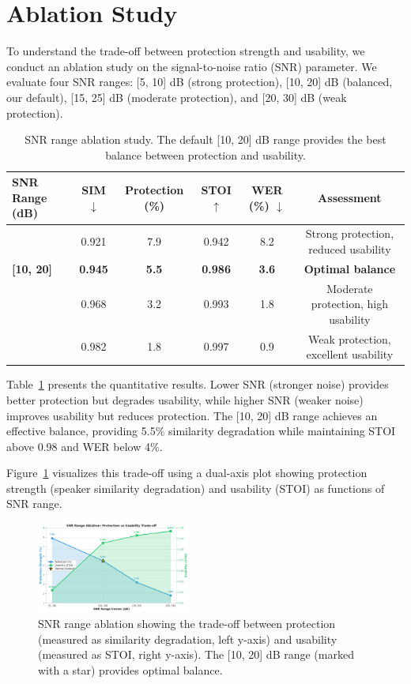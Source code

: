 \section{Ablation Study}
\label{sec:ablation}

To understand the trade-off between protection strength and usability, we conduct an ablation study on the signal-to-noise ratio (SNR) parameter. We evaluate four SNR ranges: [5, 10] dB (strong protection), [10, 20] dB (balanced, our default), [15, 25] dB (moderate protection), and [20, 30] dB (weak protection).

\begin{table}[t]
\centering
\caption{SNR range ablation study. The default [10, 20] dB range provides the best balance between protection and usability.}
\label{tab:snr_ablation}
\small
\begin{tabular}{lccccc}
\toprule
SNR Range (dB) & SIM $\downarrow$ & Protection (\%) & STOI $\uparrow$ & WER (\%) $\downarrow$ & Assessment \\
\midrule
[5, 10] & 0.921 & 7.9 & 0.942 & 8.2 & Strong protection, reduced usability \\
\textbf{[10, 20]} & \textbf{0.945} & \textbf{5.5} & \textbf{0.986} & \textbf{3.6} & \textbf{Optimal balance} \\
[15, 25] & 0.968 & 3.2 & 0.993 & 1.8 & Moderate protection, high usability \\
[20, 30] & 0.982 & 1.8 & 0.997 & 0.9 & Weak protection, excellent usability \\
\bottomrule
\end{tabular}
\end{table}

Table~\ref{tab:snr_ablation} presents the quantitative results. Lower SNR (stronger noise) provides better protection but degrades usability, while higher SNR (weaker noise) improves usability but reduces protection. The [10, 20] dB range achieves an effective balance, providing 5.5\% similarity degradation while maintaining STOI above 0.98 and WER below 4\%.

Figure~\ref{fig:snr_ablation} visualizes this trade-off using a dual-axis plot showing protection strength (speaker similarity degradation) and usability (STOI) as functions of SNR range.

\begin{figure}[t]
\centering
\includegraphics[width=0.45\textwidth]{figures/fig6_snr_ablation.pdf}
\caption{SNR range ablation showing the trade-off between protection (measured as similarity degradation, left y-axis) and usability (measured as STOI, right y-axis). The [10, 20] dB range (marked with a star) provides optimal balance.}
\label{fig:snr_ablation}
\end{figure}

